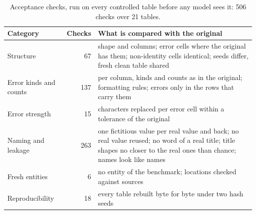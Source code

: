 \begin{table}[t]
  \caption{Acceptance checks, run on every controlled table before any model sees it: 506 checks over 21 tables.}
  \label{tab:checks}
  \small
  \setlength{\tabcolsep}{3pt}
  \begin{tabular}{@{}l r p{5.2cm}@{}}
    \toprule
    Category & Checks & What is compared with the original \\
    \midrule
    Structure & 67 & shape and columns; error cells where the original has them; non-identity cells identical; seeds differ, fresh clean table shared \\
    Error kinds and counts & 137 & per column, kinds and counts as in the original; formatting rules; errors only in the rows that carry them \\
    Error strength & 15 & characters replaced per error cell within a tolerance of the original \\
    Naming and leakage & 263 & one fictitious value per real value and back; no real value reused; no word of a real title; title shapes no closer to the real ones than chance; names look like names \\
    Fresh entities & 6 & no entity of the benchmark; locations checked against sources \\
    Reproducibility & 18 & every table rebuilt byte for byte under two hash seeds \\
    \bottomrule
  \end{tabular}
\end{table}
